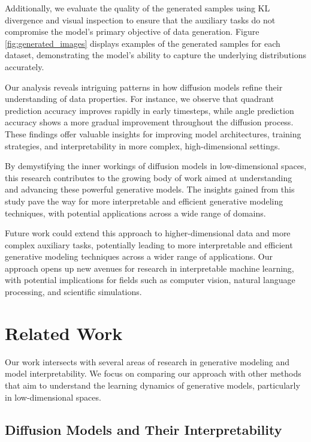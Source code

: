 \documentclass{article} %
\begin{document}
Additionally, we evaluate the quality of the generated samples using KL divergence and visual inspection to ensure that the auxiliary tasks do not compromise the model's primary objective of data generation. Figure \ref{fig:generated_images} displays examples of the generated samples for each dataset, demonstrating the model's ability to capture the underlying distributions accurately.

Our analysis reveals intriguing patterns in how diffusion models refine their understanding of data properties. For instance, we observe that quadrant prediction accuracy improves rapidly in early timesteps, while angle prediction accuracy shows a more gradual improvement throughout the diffusion process. These findings offer valuable insights for improving model architectures, training strategies, and interpretability in more complex, high-dimensional settings.

By demystifying the inner workings of diffusion models in low-dimensional spaces, this research contributes to the growing body of work aimed at understanding and advancing these powerful generative models. The insights gained from this study pave the way for more interpretable and efficient generative modeling techniques, with potential applications across a wide range of domains.

Future work could extend this approach to higher-dimensional data and more complex auxiliary tasks, potentially leading to more interpretable and efficient generative modeling techniques across a wider range of applications. Our approach opens up new avenues for research in interpretable machine learning, with potential implications for fields such as computer vision, natural language processing, and scientific simulations.

\section{Related Work}
\label{sec:related}

Our work intersects with several areas of research in generative modeling and model interpretability. We focus on comparing our approach with other methods that aim to understand the learning dynamics of generative models, particularly in low-dimensional spaces.

\subsection{Diffusion Models and Their Interpretability}
\end{document}
